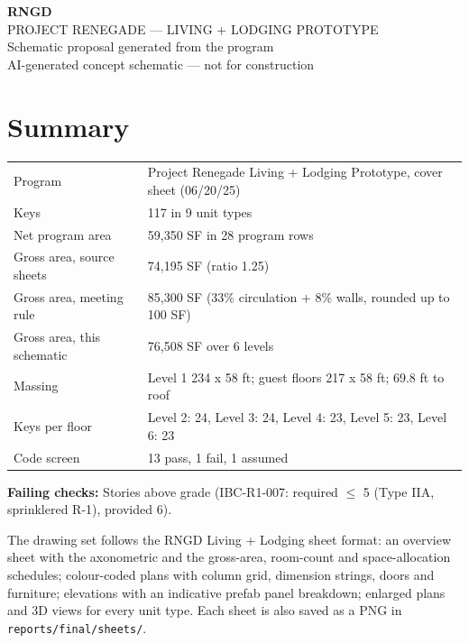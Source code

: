 \documentclass[10pt]{article}
\begin{document}
\begin{center}
{\fontsize{44}{48}\selectfont\bfseries RNGD}\\[0.6em]
{\Large PROJECT RENEGADE --- LIVING + LODGING PROTOTYPE}\\[0.3em]
{\large Schematic proposal generated from the program}\\[0.3em]
{\small\color{fail} AI-generated concept schematic --- not for construction}
\end{center}
\vspace{1em}
\section*{Summary}
\begin{tabular}{p{5.2cm}p{10.5cm}}
Program & Project Renegade Living + Lodging Prototype, cover sheet (06/20/25) \\
Keys & 117 in 9 unit types \\
Net program area & 59,350 SF in 28 program rows \\
Gross area, source sheets & 74,195 SF (ratio 1.25) \\
Gross area, meeting rule & 85,300 SF (33\% circulation + 8\% walls, rounded up to 100 SF) \\
Gross area, this schematic & 76,508 SF over 6 levels \\
Massing & Level 1 234 x 58 ft; guest floors 217 x 58 ft; 69.8 ft to roof \\
Keys per floor & Level 2: 24, Level 3: 24, Level 4: 23, Level 5: 23, Level 6: 23 \\
Code screen & 13 pass, 1 fail, 1 assumed \\
\end{tabular}

\textbf{Failing checks:} Stories above grade (IBC-R1-007: required $\le$ 5 (Type IIA, sprinklered R-1), provided 6).

The drawing set follows the RNGD Living + Lodging sheet format: an overview sheet with the axonometric and
the gross-area, room-count and space-allocation schedules; colour-coded plans with column grid, dimension
strings, doors and furniture; elevations with an indicative prefab panel breakdown; enlarged plans and 3D
views for every unit type. Each sheet is also saved as a PNG in \texttt{reports/final/sheets/}.
\end{document}
